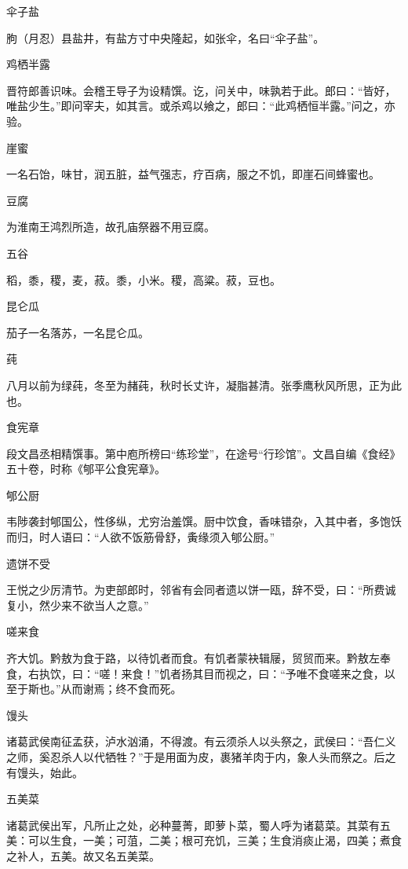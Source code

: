 \documentclass[a4paper,12pt,UTF8,twoside]{ctexbook}
\begin{document}
    伞子盐
    
    朐（月忍）县盐井，有盐方寸中央隆起，如张伞，名曰“伞子盐”。
    
    鸡栖半露
    
    晋符郎善识味。会稽王导子为设精馔。讫，问关中，味孰若于此。郎曰：“皆好，唯盐少生。”即问宰夫，如其言。或杀鸡以飨之，郎曰：“此鸡栖恒半露。”问之，亦验。
    
    崖蜜
    
    一名石饴，味甘，润五脏，益气强志，疗百病，服之不饥，即崖石间蜂蜜也。
    
    豆腐
    
    为淮南王鸿烈所造，故孔庙祭器不用豆腐。
    
    五谷
    
    稻，黍，稷，麦，菽。黍，小米。稷，高粱。菽，豆也。
    
    昆仑瓜
    
    茄子一名落苏，一名昆仑瓜。
    
    莼
    
    八月以前为绿莼，冬至为赭莼，秋时长丈许，凝脂甚清。张季鹰秋风所思，正为此也。
    
    食宪章
    
    段文昌丞相精馔事。第中庖所榜曰“练珍堂”，在途号“行珍馆”。文昌自编《食经》五十卷，时称《郇平公食宪章》。
    
    郇公厨
    
    韦陟袭封郇国公，性侈纵，尤穷治羞馔。厨中饮食，香味错杂，入其中者，多饱饫而归，时人语曰：“人欲不饭筋骨舒，夤缘须入郇公厨。”
    
    遗饼不受
    
    王悦之少厉清节。为吏部郎时，邻省有会同者遗以饼一瓯，辞不受，曰：“所费诚复小，然少来不欲当人之意。”
    
    嗟来食
    
    齐大饥。黔敖为食于路，以待饥者而食。有饥者蒙袂辑屦，贸贸而来。黔敖左奉食，右执饮，曰：“嗟！来食！”饥者扬其目而视之，曰：“予唯不食嗟来之食，以至于斯也。”从而谢焉；终不食而死。
    
    馒头
    
    诸葛武侯南征孟获，泸水汹涌，不得渡。有云须杀人以头祭之，武侯曰：“吾仁义之师，奚忍杀人以代牺牲？”于是用面为皮，裹猪羊肉于内，象人头而祭之。后之有馒头，始此。
    
    五美菜
    
    诸葛武侯出军，凡所止之处，必种蔓菁，即萝卜菜，蜀人呼为诸葛菜。其菜有五美：可以生食，一美；可菹，二美；根可充饥，三美；生食消痰止渴，四美；煮食之补人，五美。故又名五美菜。
    
\end{document}
